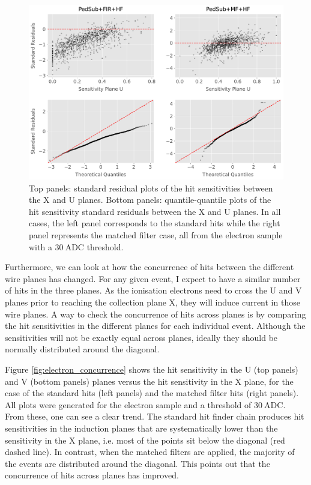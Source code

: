 \begin{figure}[t]
	\centering
	\includegraphics[width=.99\linewidth]{Images/Matched_Filter/hit_study_electron_residuals}
	\caption[Standard residuals and quantile-quantile plots for the hit sensitivity of the X and U planes.]{Top panels: standard residual plots of the hit sensitivities between the X and U planes. Bottom panels: quantile-quantile plots of the hit sensitivity standard residuals between the X and U planes. In all cases, the left panel corresponds to the standard hits while the right panel represents the matched filter case, all from the electron sample with a $30 \ \mathrm{ADC}$ threshold.}
	\label{fig:electron_residuals}
\end{figure}

Furthermore, we can look at how the concurrence of hits between the different wire planes has changed. For any given event, I expect to have a similar number of hits in the three planes. As the ionisation electrons need to cross the U and V planes prior to reaching the collection plane X, they will induce current in those wire planes. A way to check the concurrence of hits across planes is by comparing the hit sensitivities in the different planes for each individual event. Although the sensitivities will not be exactly equal across planes, ideally they should be normally distributed around the diagonal.

Figure \ref{fig:electron_concurrence} shows the hit sensitivity in the U (top panels) and V (bottom panels) planes versus the hit sensitivity in the X plane, for the case of the standard hits (left panels) and the matched filter hits (right panels). All plots were generated for the electron sample and a threshold of $30 \ \mathrm{ADC}$. From these, one can see a clear trend. The standard hit finder chain produces hit sensitivities in the induction planes that are systematically lower than the sensitivity in the X plane, i.e. most of the points sit below the diagonal (red dashed line). In contrast, when the matched filters are applied, the majority of the events are distributed around the diagonal. This points out that the concurrence of hits across planes has improved.

